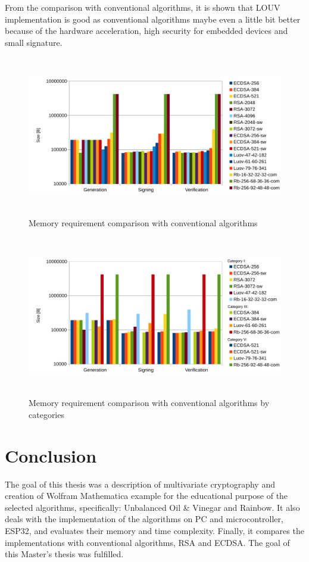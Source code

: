 \documentclass[thesis=M,english]{FITthesis}[2019/12/23]
\begin{document}
\bigskip
\noindent
From the comparison with conventional algorithms, it is shown that LOUV implementation is good as conventional algorithms maybe even a little bit better because of the hardware acceleration, high security for embedded devices and small signature.

\begin{figure}[H]
\centering
\includegraphics[width=13cm,height=7cm]{images/mem-all.pdf}
\caption{Memory requirement comparison with conventional algorithms}
\label{mem-all}
\end{figure}

\bigskip\bigskip\bigskip
\begin{figure}[H]
\centering
\includegraphics[width=13cm,height=7cm]{images/mem-category-all.pdf}
\caption{Memory requirement comparison with conventional algorithms by categories}
\label{mem-category-all}
\end{figure}

\chapter{Conclusion}
The goal of this thesis was a description of multivariate cryptography and creation of Wolfram Mathematica example for the educational purpose of the selected algorithms, specifically: Unbalanced Oil \& Vinegar and Rainbow. It also deals with the implementation of the algorithms on PC and microcontroller, ESP32, and evaluates their memory and time complexity. Finally, it compares the implementations with conventional algorithms, RSA and ECDSA. The goal of this Master's thesis was fulfilled.
\end{document}
